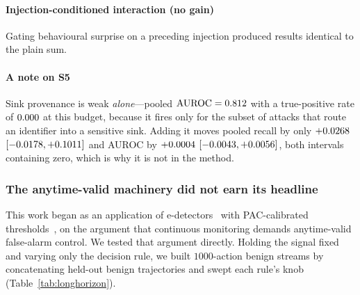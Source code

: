 \documentclass[preprint,12pt,authoryear]{elsarticle}
\theoremstyle{definition}
\begin{document}
\paragraph{Injection-conditioned interaction (no gain)} Gating behavioural
surprise on a preceding injection produced results identical to the plain sum.

\paragraph{A note on S5} Sink provenance is weak \emph{alone}---pooled
$\mathrm{AUROC} = 0.812$ with a true-positive rate of $0.000$ at
this budget,
because it fires only for the subset of attacks that route an identifier into a
sensitive sink. Adding it moves pooled recall by only $+0.0268$
$[-0.0178, +0.1011]$ and AUROC by $+0.0004$
$[-0.0043, +0.0056]$, both intervals containing zero, which is
why it is not in the method.

\subsubsection{The anytime-valid machinery did not earn its headline}
\label{sec:longhorizon}

This work began as an application of e-detectors~\citep{shin2023edetectors} with
PAC-calibrated thresholds~\citep{sadhuka2025evaluator}, on the argument that
continuous monitoring demands anytime-valid false-alarm control. We tested that
argument directly. Holding the signal fixed and varying only the decision rule, we
built $1000$-action benign streams by concatenating held-out benign trajectories
and swept each rule's knob (Table~\ref{tab:longhorizon}).
\end{document}

